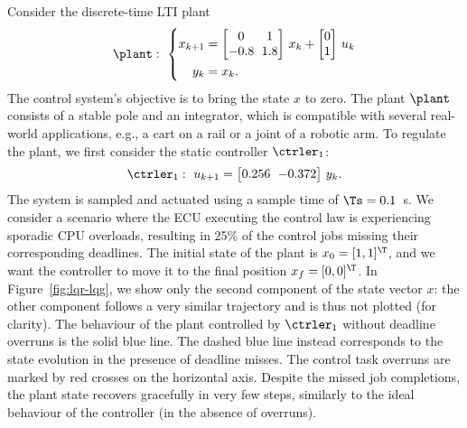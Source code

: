 \begin{example}%
    Consider the discrete-time LTI plant
     \begin{equation}
        \label{eq:example-plant}
        {\setlength\arraycolsep{3pt}
            \plant: \,\, \left\{
            \begin{aligned}
                x_{k+1} &= 
                \begin{bmatrix}
                    0 & 1 \\
                    -0.8 & 1.8
                \end{bmatrix}\,x_k + 
                \begin{bmatrix}
                    0 \\
                    1
                \end{bmatrix}\,u_k \\
                y_k &= x_k.
                 \end{aligned}
            \right.
        }
    \end{equation}   
    The control system's objective is to bring the state $x$ to zero.
    The plant $\plant$ consists of a stable pole and an integrator, which is compatible with several real-world applications, e.g., a cart on a rail or a joint of a robotic arm.
    To regulate the plant, we first consider the static controller $\ctrler_1$:
    \begin{equation*}
        {\setlength\arraycolsep{3pt}
        \begin{aligned}
            \ctrler_1: \,\, 
            u_{k+1} = 
            \begin{bmatrix}
                0.256 & -0.372
            \end{bmatrix}\,y_k.
        \end{aligned}
        }
    \end{equation*}
    The system is sampled and actuated using a sample time of $\Ts = 0.1$~s.
    We consider a scenario where the ECU executing the control law is experiencing sporadic CPU overloads, resulting in 25\% of the control jobs missing their corresponding deadlines.
    The initial state of the plant is $x_0 = [1, 1]^\T$, and we want the controller to move it to the final position $x_{f} = [0, 0]^\T$.
    In Figure~\ref{fig:lqr-lqg}, we show only the second component of the state vector $x$: the other component follows a very similar trajectory and is thus not plotted (for clarity).
    The behaviour of the plant controlled by $\ctrler_1$ without deadline overruns is the solid blue line.
    The dashed blue line instead corresponds to the state evolution in the presence of deadline misses.
    The control task overruns are marked by red crosses on the horizontal axis.
    Despite the missed job completions, the plant state recovers gracefully in very few steps, similarly to the ideal behaviour of the controller (in the absence of overruns).
    

\end{example}
